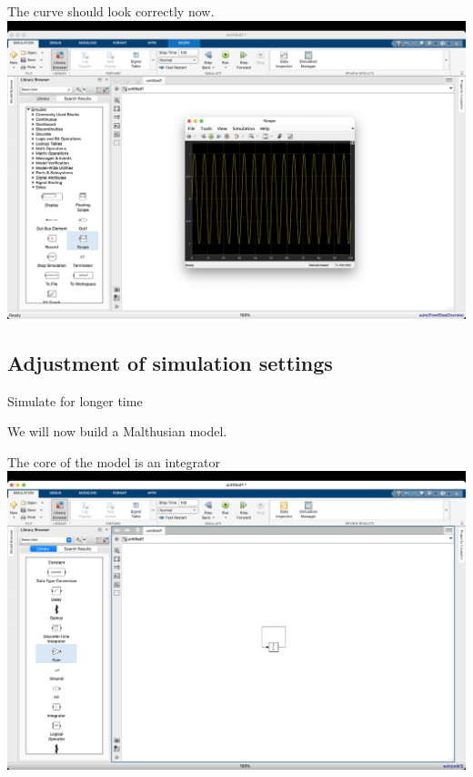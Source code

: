 \begin{frame}{The curve should look correctly now.}
    \hspace*{-11mm}
    \includegraphics[width=\paperwidth]{lesson_2/images/simulink_screen_12.png}
\end{frame}

\subsection{Adjustment of simulation settings}
\begin{frame}{Simulate for longer time}
\Large
\begin{center}
We will now build a Malthusian model. 
\end{center}
\end{frame}


\begin{frame}{The core of the model is an integrator}
    \hspace*{-11mm}
    \includegraphics[width=\paperwidth]{lesson_2/images/simulink_screen_18.png}
\end{frame}

